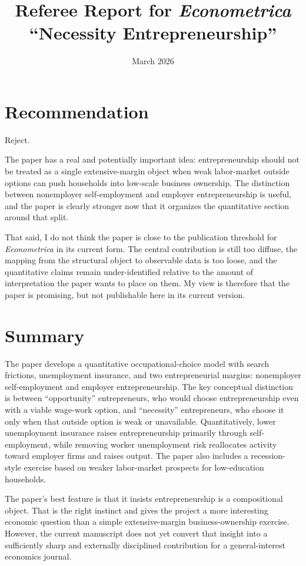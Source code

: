 \documentclass[11pt]{article}
\title{Referee Report for \textit{Econometrica}\\[4pt]
\large ``Necessity Entrepreneurship''}
\author{}
\date{March 2026}
\begin{document}
\maketitle

\section*{Recommendation}

Reject.

\medskip

The paper has a real and potentially important idea: entrepreneurship should not
be treated as a single extensive-margin object when weak labor-market outside
options can push households into low-scale business ownership. The distinction
between nonemployer self-employment and employer entrepreneurship is useful, and
the paper is clearly stronger now that it organizes the quantitative section
around that split.

That said, I do not think the paper is close to the publication threshold for
\textit{Econometrica} in its current form. The central contribution is still too
diffuse, the mapping from the structural object to observable data is too loose,
and the quantitative claims remain under-identified relative to the amount of
interpretation the paper wants to place on them. My view is therefore that the
paper is promising, but not publishable here in its current version.

\section*{Summary}

The paper develops a quantitative occupational-choice model with search frictions,
unemployment insurance, and two entrepreneurial margins: nonemployer
self-employment and employer entrepreneurship. The key conceptual distinction is
between ``opportunity'' entrepreneurs, who would choose entrepreneurship even
with a viable wage-work option, and ``necessity'' entrepreneurs, who choose it
only when that outside option is weak or unavailable. Quantitatively, lower
unemployment insurance raises entrepreneurship primarily through self-employment,
while removing worker unemployment risk reallocates activity toward employer
firms and raises output. The paper also includes a recession-style exercise based
on weaker labor-market prospects for low-education households.

The paper's best feature is that it insists entrepreneurship is a compositional
object. That is the right instinct and gives the project a more interesting
economic question than a simple extensive-margin business-ownership exercise.
However, the current manuscript does not yet convert that insight into a
sufficiently sharp and externally disciplined contribution for a general-interest
economics journal.
\end{document}
